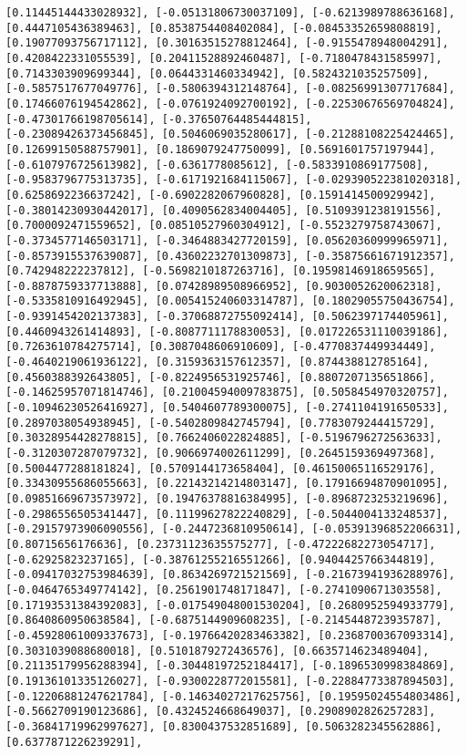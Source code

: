 \documentclass[11pt]{article}
\begin{document}
\begin{Verbatim}[commandchars=\\\{\}]
[0.11445144433028932], [-0.05131806730037109], [-0.6213989788636168], [0.4447105436389463], [0.8538754408402084], [-0.08453352659808819], [0.19077093756717112], [0.30163515278812464], [-0.9155478948004291], [0.4208422331055539], [0.20411528892460487], [-0.7180478431585997], [0.7143303909699344], [0.0644331460334942], [0.5824321035257509], [-0.5857517677049776], [-0.5806394312148764], [-0.08256991307717684], [0.17466076194542862], [-0.0761924092700192], [-0.22530676569704824], [-0.47301766198705614], [-0.37650764485444815], [-0.23089426373456845], [0.5046069035280617], [-0.21288108225424465], [0.12699150588757901], [0.1869079247750099], [0.5691601757197944], [-0.6107976725613982], [-0.6361778085612], [-0.5833910869177508], [-0.9583796775313735], [-0.6171921684115067], [-0.029390522381020318], [0.6258692236637242], [-0.6902282067960828], [0.1591414500929942], [-0.38014230930442017], [0.4090562834004405], [0.5109391238191556], [0.7000092471559652], [0.08510527960304912], [-0.5523279758743067], [-0.3734577146503171], [-0.3464883427720159], [0.05620360999965971], [-0.8573915537639087], [0.43602232701309873], [-0.35875661671912357], [0.742948222237812], [-0.5698210187263716], [0.19598146918659565], [-0.8878759337713888], [0.07428989508966952], [0.9030052620062318], [-0.5335810916492945], [0.005415240603314787], [0.18029055750436754], [-0.9391454202137383], [-0.37068872755092414], [0.5062397174405961], [0.4460943261414893], [-0.8087711178830053], [0.017226531110039186], [0.7263610784275714], [0.3087048606910609], [-0.4770837449934449], [-0.4640219061936122], [0.3159363157612357], [0.874438812785164], [0.4560388392643805], [-0.8224956531925746], [0.8807207135651866], [-0.14625957071814746], [0.21004594009783875], [0.5058454970320757], [-0.10946230526416927], [0.5404607789300075], [-0.2741104191650533], [0.2897038054938945], [-0.5402809842745794], [0.7783079244415729], [0.30328954428278815], [0.7662406022824885], [-0.5196796272563633], [-0.3120307287079732], [0.9066974002611299], [0.2645159369497368], [0.5004477288181824], [0.5709144173658404], [0.46150065116529176], [0.33430955686055663], [0.22143214214803147], [0.17916694870901095], [0.09851669673573972], [0.19476378816384995], [-0.8968723253219696], [-0.2986556505341447], [0.11199627822240829], [-0.5044004133248537], [-0.29157973906090556], [-0.2447236810950614], [-0.05391396852206631], [0.80715656176636], [0.23731123635575277], [-0.47222682273054717], [-0.62925823237165], [-0.38761255216551266], [0.9404425766344819], [-0.09417032753984639], [0.8634269721521569], [-0.21673941936288976], [-0.0464765349774142], [0.2561901748171847], [-0.2741090671303558], [0.17193531384392083], [-0.017549048001530204], [0.2680952594933779], [0.8640860950638584], [-0.6875144909608235], [-0.2145448723935787], [-0.45928061009337673], [-0.19766420283463382], [0.2368700367093314], [0.3031039088680018], [0.5101879272436576], [0.6635714623489404], [0.21135179956288394], [-0.30448197252184417], [-0.1896530998384869], [0.19136101335126027], [-0.9300228772015581], [-0.22884773387894503], [-0.12206881247621784], [-0.14634027217625756], [0.19595024554803486], [-0.5662709190123686], [0.4324524668649037], [0.2908902826257283], [-0.36841719962997627], [0.8300437532851689], [0.5063282345562886], [0.6377871226239291], 
\end{Verbatim}
\end{document}
